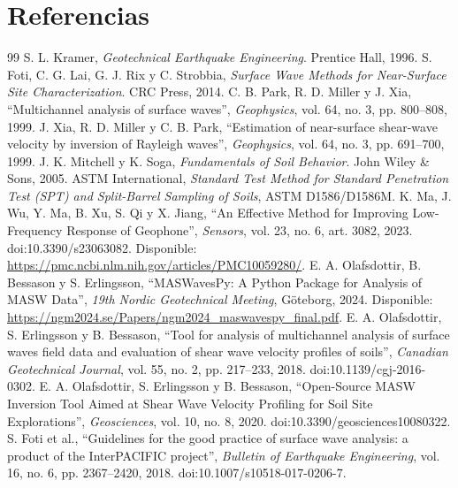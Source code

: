 \documentclass[11pt,a4paper]{article}
\begin{document}
\section{Referencias}
\renewcommand{\refname}{}
\vspace{-1.7em}
\begin{thebibliography}{99}\footnotesize
\setlength{\itemsep}{0.02em}
 S. L. Kramer, \textit{Geotechnical Earthquake Engineering}. Prentice Hall, 1996.
 S. Foti, C. G. Lai, G. J. Rix y C. Strobbia, \textit{Surface Wave Methods for Near-Surface Site Characterization}. CRC Press, 2014.
 C. B. Park, R. D. Miller y J. Xia, ``Multichannel analysis of surface waves'', \textit{Geophysics}, vol. 64, no. 3, pp. 800--808, 1999.
 J. Xia, R. D. Miller y C. B. Park, ``Estimation of near-surface shear-wave velocity by inversion of Rayleigh waves'', \textit{Geophysics}, vol. 64, no. 3, pp. 691--700, 1999.
 J. K. Mitchell y K. Soga, \textit{Fundamentals of Soil Behavior}. John Wiley \& Sons, 2005.
 ASTM International, \textit{Standard Test Method for Standard Penetration Test (SPT) and Split-Barrel Sampling of Soils}, ASTM D1586/D1586M.
 K. Ma, J. Wu, Y. Ma, B. Xu, S. Qi y X. Jiang, ``An Effective Method for Improving Low-Frequency Response of Geophone'', \textit{Sensors}, vol. 23, no. 6, art. 3082, 2023. doi:10.3390/s23063082. Disponible: \url{https://pmc.ncbi.nlm.nih.gov/articles/PMC10059280/}.
 E. A. Olafsdottir, B. Bessason y S. Erlingsson, ``MASWavesPy: A Python Package for Analysis of MASW Data'', \textit{19th Nordic Geotechnical Meeting}, G\"oteborg, 2024. Disponible: \url{https://ngm2024.se/Papers/ngm2024_maswavespy_final.pdf}.
 E. A. Olafsdottir, S. Erlingsson y B. Bessason, ``Tool for analysis of multichannel analysis of surface waves field data and evaluation of shear wave velocity profiles of soils'', \textit{Canadian Geotechnical Journal}, vol. 55, no. 2, pp. 217--233, 2018. doi:10.1139/cgj-2016-0302.
 E. A. Olafsdottir, S. Erlingsson y B. Bessason, ``Open-Source MASW Inversion Tool Aimed at Shear Wave Velocity Profiling for Soil Site Explorations'', \textit{Geosciences}, vol. 10, no. 8, 2020. doi:10.3390/geosciences10080322.
 S. Foti et al., ``Guidelines for the good practice of surface wave analysis: a product of the InterPACIFIC project'', \textit{Bulletin of Earthquake Engineering}, vol. 16, no. 6, pp. 2367--2420, 2018. doi:10.1007/s10518-017-0206-7.

\end{thebibliography}
\end{document}
